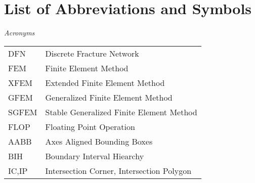 \chapter*{List of Abbreviations and Symbols}

\noindent\emph{Acronyms}
\vspace{0.5cm}

\begin{tabularx}{0.9\linewidth}{@{}lX@{}}
DFN & Discrete Fracture Network \\
FEM & Finite Element Method \\
XFEM & Extended Finite Element Method \\
GFEM & Generalized Finite Element Method \\
SGFEM & Stable Generalized Finite Element Method \\
FLOP & Floating Point Operation \\
AABB & Axes Aligned Bounding Boxes \\
BIH & Boundary Interval Hiearchy \\
IC,IP & Intersection Corner, Intersection Polygon\\
\end{tabularx}
\pagebreak

